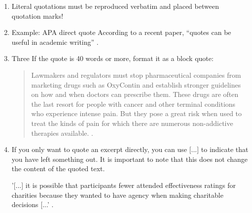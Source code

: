 \begin{enumerate}
    \item Literal quotations must be reproduced verbatim and placed between quotation marks!
    \item Example: APA direct quote According to a recent paper, “quotes can be useful in academic writing” \parencite[p. 25]{singh2019}.
    \item Three If the quote is 40 words or more, format it as a block quote: \begin{quote}
        Lawmakers and regulators must stop pharmaceutical companies from marketing drugs such as OxyContin and establish stronger guidelines on how and when doctors can prescribe them. These drugs are often the last resort for people with cancer and other terminal conditions who experience intense pain. But they pose a great risk when used to treat the kinds of pain for which there are numerous non-addictive therapies available. \parencite{editorialboard2018}.
    \end{quote}
    \item  If you only want to quote an excerpt directly, you can use [...] to indicate that you have left something out. It is
important to note that this does not change the content of the quoted text.
    
    '[...] it is possible that participants fewer attended effectiveness ratings for charities because they wanted to have agency when making charitable
decisions [...' \parencite[p. 827]{ransbotham2018}.

\end{enumerate}
